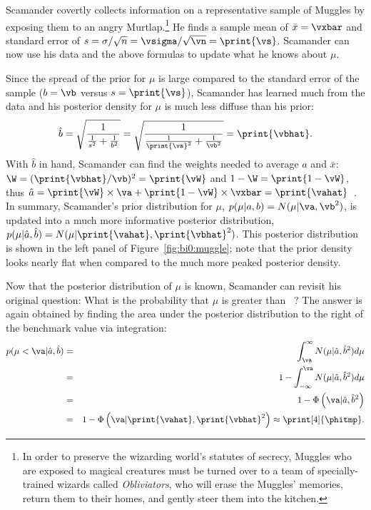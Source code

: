 Scamander covertly collects information on a representative sample of \vn{ }Muggles by exposing them to an angry Murtlap.\footnote{In order to preserve the wizarding world's statutes of secrecy, Muggles who are exposed to magical creatures must be turned over to a team of specially-trained wizards called \emph{Obliviators}, who will erase the Muggles' memories, return them to their homes, and gently steer them into the kitchen.} He finds a sample mean of $\bar x = \vxbar$ and standard error of $s = \sigma/\sqrt{n} = \vsigma/\sqrt{\vn} = \print{\vs}$. Scamander can now use his data and the above formulas to update what he knows about $\mu$.  

Since the spread of the prior for $\mu$ is large compared to the standard error of the sample ($b = \vb$ versus $s = \print{\vs}$), Scamander has learned much from the data and his posterior density for $\mu$ is much less diffuse than his prior:
$$
\hat{b} = \sqrt{\frac{1}{\frac{1}{s^2}+\frac{1}{b^2}}}
        = \sqrt{\frac{1}{\frac{1}{\print{\vs}^2}+\frac{1}{\vb^2}}}
        = \print{\vbhat}.
$$
\noindent With $\hat{b}$ in hand, Scamander can find the weights needed to average $a$ and $\bar x$: $\W = (\print{\vbhat}/\vb)^2 = \print{\vW}$ and $1-\W = \print{1-\vW}$, thus $\hat{a} = \print{\vW} \times \va + \print{1-\vW} \times \vxbar = \print{\vahat}$~\units.  In summary, Scamander's prior distribution for $\mu$, $p(\mu|a,b) = N(\mu|\va,\vb^2)$, is updated into a much more informative posterior distribution, $p(\mu|\hat{a},\hat{b}) = N(\mu | \print{\vahat}, \print{\vbhat}^2)$. {This posterior distribution is shown in the left panel of Figure~\ref{fig:bi0:muggle}; note that the prior density looks nearly flat when compared to the much more peaked posterior density.}

Now that the posterior distribution of $\mu$ is known, Scamander can revisit his original question: What is the probability that $\mu$ is greater than \va~\units? The answer is again obtained by finding the area under the posterior distribution to the right of the benchmark value via integration:
\begin{eqnarray*}
p(\mu < \va | \hat{a}, \hat{b})
	&=& \int_{\va}^{\infty}N(\mu | \hat{a},\hat{b}^2)d\mu \\
	&=& 1 - \int_{-\infty}^{\va}N(\mu | \hat{a},\hat{b}^2)d\mu \\
    &=& 1 - \Phi\left(\va | \hat{a},\hat{b}^2\right) \\
    &=& 1 - \Phi\left(\va | \print{\vahat},\print{\vbhat}^2\right) \approx \print[4]{\phitmp}.
\end{eqnarray*}

